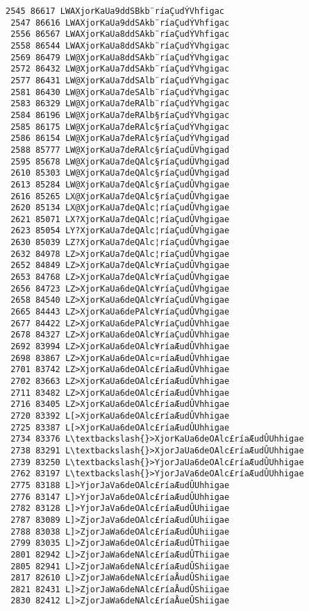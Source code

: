\documentclass[11pt]{article}
\begin{document}
\begin{Verbatim}[commandchars=\\\{\}]
 2545 86617 LWAXjorKaUa9ddSBkb¨ríaÇudÝVhfigac
 2547 86616 LWAXjorKaUa9ddSAkb¨ríaÇudÝVhfigac
 2556 86567 LWAXjorKaUa8ddSAkb¨ríaÇudÝVhfigac
 2558 86544 LWAXjorKaUa8ddSAkb¨ríaÇudÝVhgigac
 2569 86479 LW@XjorKaUa8ddSAkb¨ríaÇudÝVhgigac
 2572 86432 LW@XjorKaUa7ddSAkb¨ríaÇudÝVhgigac
 2577 86431 LW@XjorKaUa7ddSAlb¨ríaÇudÝVhgigac
 2581 86430 LW@XjorKaUa7deSAlb¨ríaÇudÝVhgigac
 2583 86329 LW@XjorKaUa7deRAlb¨ríaÇudÝVhgigac
 2584 86196 LW@XjorKaUa7deRAlb§ríaÇudÝVhgigac
 2585 86175 LW@XjorKaUa7deRAlc§ríaÇudÝVhgigac
 2586 86154 LW@XjorKaUa7deRAlc§ríaÇudÝVhgigad
 2588 85777 LW@XjorKaUa7deRAlc§ríaÇudÜVhgigad
 2595 85678 LW@XjorKaUa7deQAlc§ríaÇudÜVhgigad
 2610 85303 LW@XjorKaUa7deQAlc§ríaÇudÛVhgigad
 2613 85284 LW@XjorKaUa7deQAlc§ríaÇudÛVhgigae
 2616 85265 LX@XjorKaUa7deQAlc§ríaÇudÛVhgigae
 2620 85134 LX@XjorKaUa7deQAlc¦ríaÇudÛVhgigae
 2621 85071 LX?XjorKaUa7deQAlc¦ríaÇudÛVhgigae
 2623 85054 LY?XjorKaUa7deQAlc¦ríaÇudÛVhgigae
 2630 85039 LZ?XjorKaUa7deQAlc¦ríaÇudÛVhgigae
 2632 84978 LZ>XjorKaUa7deQAlc¦ríaÇudÛVhgigae
 2652 84849 LZ>XjorKaUa7deQAlc¥ríaÇudÛVhgigae
 2653 84768 LZ>XjorKaUa7deQAlc¥ríaÇudÛVhgigae
 2656 84723 LZ>XjorKaUa6deQAlc¥ríaÇudÛVhgigae
 2658 84540 LZ>XjorKaUa6deQAlc¥ríaÇudÛVhgigae
 2665 84443 LZ>XjorKaUa6dePAlc¥ríaÇudÛVhgigae
 2677 84422 LZ>XjorKaUa6dePAlc¥ríaÇudÛVhhigae
 2678 84327 LZ>XjorKaUa6deOAlc¥ríaÇudÛVhhigae
 2692 83994 LZ>XjorKaUa6deOAlc¥ríaÆudÛVhhigae
 2698 83867 LZ>XjorKaUa6deOAlc¤ríaÆudÛVhhigae
 2701 83742 LZ>XjorKaUa6deOAlc£ríaÆudÛVhhigae
 2702 83663 LZ>XjorKaUa6deOAlc£ríaÆudÛVhhigae
 2711 83482 LZ>XjorKaUa6deOAlc£ríaÆudÛVhhigae
 2716 83405 LZ>XjorKaUa6deOAlc£ríaÆudÛVhhigae
 2720 83392 L[>XjorKaUa6deOAlc£ríaÆudÛVhhigae
 2725 83387 L[>XjorKaUa6deOAlc£ríaÆudÛUhhigae
 2734 83376 L\textbackslash{}>XjorKaUa6deOAlc£ríaÆudÛUhhigae
 2738 83291 L\textbackslash{}>XjorJaUa6deOAlc£ríaÆudÛUhhigae
 2739 83250 L\textbackslash{}>YjorJaUa6deOAlc£ríaÆudÛUhhigae
 2762 83197 L\textbackslash{}>YjorJaVa6deOAlc£ríaÆudÛUhhigae
 2775 83188 L]>YjorJaVa6deOAlc£ríaÆudÛUhhigae
 2776 83147 L]>YjorJaVa6deOAlc£ríaÆudÛUhhigae
 2782 83128 L]>YjorJaVa6deOAlc£ríaÆudÛUhiigae
 2787 83089 L]>ZjorJaVa6deOAlc£ríaÆudÛUhiigae
 2788 83038 L]>ZjorJaWa6deOAlc£ríaÆudÛUhiigae
 2799 83035 L]>ZjorJaWa6deOAlc£ríaÆudÛThiigae
 2801 82942 L]>ZjorJaWa6deNAlc£ríaÆudÛThiigae
 2805 82941 L]>ZjorJaWa6deNAlc£ríaÆudÛShiigae
 2817 82610 L]>ZjorJaWa6deNAlc£ríaÅudÛShiigae
 2821 82431 L]>ZjorJaWa6deNAlc£ríaÅudÛShiigae
 2830 82412 L]>ZjorJaWa6deNAlc£ríaÅueÛShiigae

\end{Verbatim}
\end{document}
